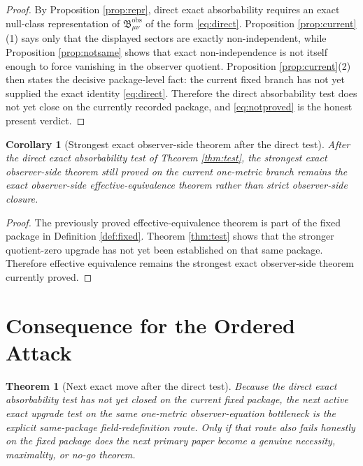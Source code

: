 \documentclass[11pt]{article}
\newcommand{\ObsBurden}{\mathfrak B_{\mu\nu}^{\mathrm{obs}}}
\newtheorem{corollary}{Corollary}
\newtheorem{theorem}{Theorem}
\begin{document}
\begin{proof}
By Proposition \ref{prop:repr}, direct exact absorbability requires an exact null-class representation of \(\ObsBurden\) of the form \eqref{eq:direct}. Proposition \ref{prop:current}(1) says only that the displayed sectors are exactly non-independent, while Proposition \ref{prop:notsame} shows that exact non-independence is not itself enough to force vanishing in the observer quotient. Proposition \ref{prop:current}(2) then states the decisive package-level fact: the current fixed branch has not yet supplied the exact identity \eqref{eq:direct}. Therefore the direct absorbability test does not yet close on the currently recorded package, and \eqref{eq:notproved} is the honest present verdict.
\end{proof}

\begin{corollary}[Strongest exact observer-side theorem after the direct test]
\label{cor:strongest}
After the direct exact absorbability test of Theorem \ref{thm:test}, the strongest exact observer-side theorem still proved on the current one-metric branch remains the exact observer-side effective-equivalence theorem rather than strict observer-side closure.
\end{corollary}

\begin{proof}
The previously proved effective-equivalence theorem is part of the fixed package in Definition \ref{def:fixed}. Theorem \ref{thm:test} shows that the stronger quotient-zero upgrade has not yet been established on that same package. Therefore effective equivalence remains the strongest exact observer-side theorem currently proved.
\end{proof}

\section{Consequence for the Ordered Attack}

\begin{theorem}[Next exact move after the direct test]
\label{thm:next}
Because the direct exact absorbability test has not yet closed on the current fixed package, the next active exact upgrade test on the same one-metric observer-equation bottleneck is the explicit same-package field-redefinition route. Only if that route also fails honestly on the fixed package does the next primary paper become a genuine necessity, maximality, or no-go theorem.
\end{theorem}
\end{document}
